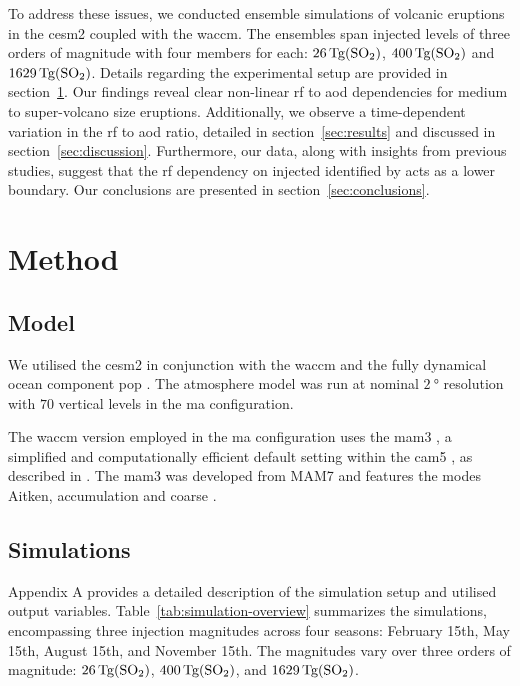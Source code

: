 \documentclass{ametsocV6.1}
\newcommand{\iso}[1][i]{{#1}njected \ce{SO2}}
\begin{document}
To address these issues, we conducted ensemble simulations of volcanic eruptions in the
\gls{cesm2} coupled with the \gls{waccm}. The ensembles span \iso{} levels of three
orders of magnitude with four members for each: \(\SI{26}{\tera\gram(\ce{SO2})}\),
\(\SI{400}{\tera\gram(\ce{SO2})}\) and \(\SI{1629}{\tera\gram(\ce{SO2})}\). Details
regarding the experimental setup are provided in section~\ref{sec:method}. Our findings
reveal clear non-linear \gls{rf} to \gls{aod} dependencies for medium to super-volcano
size eruptions. Additionally, we observe a time-dependent variation in the \gls{rf} to
\gls{aod} ratio, detailed in section~\ref{sec:results} and discussed in
section~\ref{sec:discussion}. Furthermore, our data, along with insights from previous
studies, suggest that the \gls{rf} dependency on \iso{} identified by
\citet{niemeier2015} acts as a lower boundary. Our conclusions are presented in
section~\ref{sec:conclusions}.

\section{Method}\label{sec:method}

\subsection{Model}

We utilised the \gls{cesm2} \citep{danabasoglu2020} in conjunction with the \gls{waccm}
\citep{gettleman2019} and the fully dynamical ocean component \gls{pop}
\citep{smith2010, danabasoglu2020}. The atmosphere model was run at nominal
\(\SI{2}{\degree}\) resolution with \(70\) vertical levels in the \gls{ma}
configuration.

The \gls{waccm} version employed in the \gls{ma} configuration uses the \gls{mam3}
\citep{gettleman2019}, a simplified and computationally efficient default setting within
the \gls{cam5} \citep{liu2016}, as described in \citet{liu2012}. The \gls{mam3} was
developed from MAM7 and features the modes Aitken, accumulation and coarse
\citep{liu2016}.

\subsection{Simulations}

Appendix A provides a detailed description of the simulation setup and utilised output
variables. Table~\ref{tab:simulation-overview} summarizes the simulations, encompassing
three  injection magnitudes across four seasons: February 15th, May 15th, August
15th, and November 15th. The magnitudes vary over three orders of magnitude:
\(\SI{26}{\tera\gram(\ce{SO2})}\), \(\SI{400}{\tera\gram(\ce{SO2})}\), and
\(\SI{1629}{\tera\gram(\ce{SO2})}\).
\end{document}
